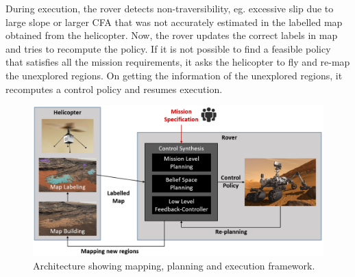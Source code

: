 \documentclass[letterpaper]{article} %
\begin{document}
	During execution, the rover detects non-traversibility, eg. excessive slip due to large slope or larger CFA that was not accurately estimated in the labelled map obtained from the helicopter. Now, the rover updates the correct labels in map and tries to recompute the policy. If it is not possible to find a feasible policy that satisfies all the mission requirements, it asks the helicopter to fly and re-map the unexplored regions. On getting the information of the unexplored regions, it recomputes a control policy and resumes execution.
    	\begin{figure}[h!]
    	\centering
    	\includegraphics[width=\columnwidth]{figs/FunctionalArcV4.png}
    	\caption{Architecture showing mapping, planning and execution framework.}
    	\label{fig:FuncArc}
    \end{figure}
	
\end{document}
